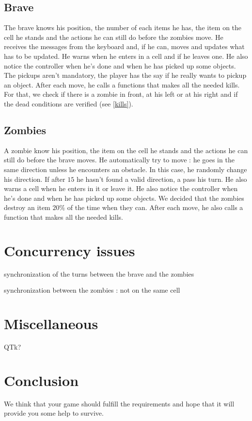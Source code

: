 \documentclass[11pt,a4paper]{article}
\begin{document}
\subsection{Brave}
The brave knows his position, the number of each items he has, the item on the cell he stands and the actions he can still do before the zombies move. He receives the messages from the keyboard and, if he can, moves and updates what has to be updated. He warns when he enters in a cell and if he leaves one. He also notice the controller when he's done and when he has picked up some objects. The pickups aren't mandatory, the player has the say if he really wants to pickup an object. After each move, he calls a functions that makes all the needed kills. For that, we check if there is a zombie in front, at his left or at his right and if the dead conditions are verified (see \ref{kills}). 

\subsection{Zombies}
A zombie know his position, the item on the cell he stands and the actions he can still do before the brave moves. He automatically try to move : he goes in the same direction unless he encounters an obstacle. In this case, he randomly change his direction. If after $15$ he hasn't found a valid direction, a pass his turn. He also warns a cell when he enters in it or leave it. He also notice the controller when he's done and when he has picked up some objects. We decided that the zombies destroy an item $20\%$ of the time when they can. After each move, he also calls a function that makes all the needed kills.

\section{Concurrency issues}
synchronization of the turns between the brave and the zombies

synchronization between the zombies : not on the same cell


\section{Miscellaneous}
QTk?

    
\section*{Conclusion}
We think that your game should fulfill the requirements and hope that it will provide you some help to survive.
    
\end{document}
